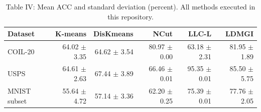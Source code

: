 \begin{table}[ht]
\centering
\caption{Table IV: Mean ACC and standard deviation (percent). All methods executed in this repository.}
\begin{tabular}{lrrrrr}
\toprule
Dataset & K-means & DisKmeans & NCut & LLC-L & LDMGI \\
\midrule
COIL-20 & 64.02 $\pm$ 3.35 & 64.62 $\pm$ 3.54 & 80.97 $\pm$ 0.00 & 63.18 $\pm$ 2.31 & 81.95 $\pm$ 1.89 \\
USPS & 64.61 $\pm$ 2.63 & 67.44 $\pm$ 3.89 & 66.46 $\pm$ 0.01 & 95.35 $\pm$ 0.01 & 85.50 $\pm$ 5.75 \\
MNIST subset & 55.64 $\pm$ 4.72 & 57.14 $\pm$ 3.36 & 62.20 $\pm$ 0.25 & 75.39 $\pm$ 0.01 & 77.76 $\pm$ 2.05 \\
\bottomrule
\end{tabular}
\end{table}
